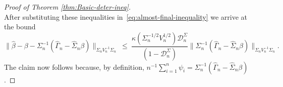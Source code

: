 \documentclass[11pt]{article}
\begin{document}
\begin{appendices}
\begin{proof}[Proof of Theorem \ref{thm:Basic-deter-ineq}]
\[\]
After substituting these inequalities in~\eqref{eq:almost-final-inequality} we arrive at the bound
\[
\|\widehat{\beta} - \beta - \Sigma_n^{-1}(\widehat{\Gamma}_n - \widehat{\Sigma}_n\beta)\|_{\Sigma_n V_n^{-1}\Sigma_n} ~\le~ \frac{\kappa(\Sigma_n^{-1/2}V_n^{1/2})\mathcal{D}_n^{\Sigma}}{(1 - \mathcal{D}_n^{\Sigma})}\|\Sigma_n^{-1}(\widehat{\Gamma}_n - \widehat{\Sigma}_n\beta)\|_{\Sigma_n V_n^{-1}\Sigma_n}.
\]
The claim now follows because, by definition,  $n^{-1}\sum_{i=1}^n \psi_i = \Sigma_n^{-1}(\widehat{\Gamma}_n - \widehat{\Sigma}_n\beta)$.

\end{proof}
\end{appendices}
\end{document}
